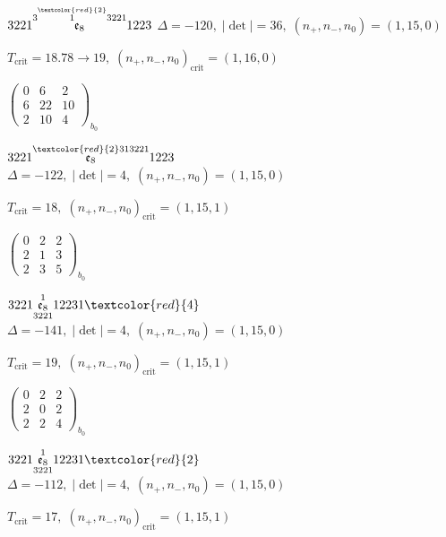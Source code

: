 \documentclass[10pt]{article}
\begin{document}
\smallskip

$3221\overset{3\overset{\textcolor{red}{2}}{1}3221}{\mathfrak{e}_8}1223$ \quad $\Delta=-120,\; |\det|=36,\; (n_+,n_-,n_0)=(1,15,0)$

\hspace{1em}$T_{\text{crit}}=18.78 \to 19,\; (n_+,n_-,n_0)_{\text{crit}}=(1,16,0)$

\hspace{2em}$\left(\begin{smallmatrix}0 & 6 & 2 \\ 6 & 22 & 10 \\ 2 & 10 & 4\end{smallmatrix}\right)_{\!b_0}$

$3221\overset{\textcolor{red}{2}313221}{\mathfrak{e}_8}1223$ \quad $\Delta=-122,\; |\det|=4,\; (n_+,n_-,n_0)=(1,15,0)$

\hspace{1em}$T_{\text{crit}}=18,\; (n_+,n_-,n_0)_{\text{crit}}=(1,15,1)$

\hspace{2em}$\left(\begin{smallmatrix}0 & 2 & 2 \\ 2 & 1 & 3 \\ 2 & 3 & 5\end{smallmatrix}\right)_{\!b_0}$

\smallskip

$3221\overset{1}{\underset{3221}{\mathfrak{e}_8}}12231\textcolor{red}{4}$ \quad $\Delta=-141,\; |\det|=4,\; (n_+,n_-,n_0)=(1,15,0)$

\hspace{1em}$T_{\text{crit}}=19,\; (n_+,n_-,n_0)_{\text{crit}}=(1,15,1)$

\hspace{2em}$\left(\begin{smallmatrix}0 & 2 & 2 \\ 2 & 0 & 2 \\ 2 & 2 & 4\end{smallmatrix}\right)_{\!b_0}$

$3221\overset{1}{\underset{3221}{\mathfrak{e}_8}}12231\textcolor{red}{2}$ \quad $\Delta=-112,\; |\det|=4,\; (n_+,n_-,n_0)=(1,15,0)$

\hspace{1em}$T_{\text{crit}}=17,\; (n_+,n_-,n_0)_{\text{crit}}=(1,15,1)$
\end{document}

